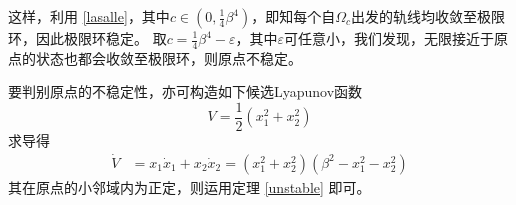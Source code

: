 \begin{example}[收敛至极限环]
  这样，利用 \ref{lasalle}，其中$c \in \left( 0,
  \frac{1}{4} \beta^4 \right)$，即知每个自$\Omega_c$出发的轨线均收敛至极限环，因此极限环稳定。
  取$c=\frac{1}{4} \beta^4-\varepsilon$，其中$\varepsilon$可任意小，我们发现，无限接近于原点的状态也都会收敛至极限环，则原点不稳定。

  \begin{note}
    要判别原点的不稳定性，亦可构造如下候选Lyapunov函数\[V=\frac12(x_1^2+x_2^2)\]
  求导得\begin{align*}
	  \dot{V}&=x_1\dot{x}_1+x_2\dot{x}_2=(x_1^2+x_2^2)(\beta^2-x_1^2-x_2^2)
  \end{align*}
  其在原点的小邻域内为正定，则运用定理 \ref{unstable} 即可。
  \end{note} 
\end{example}
